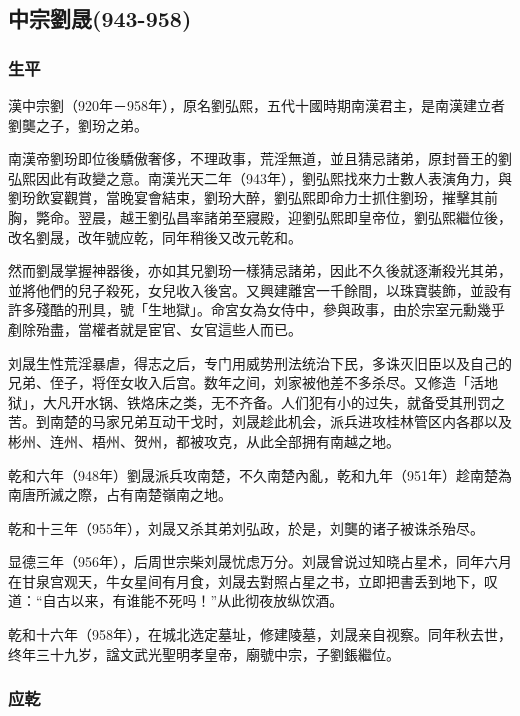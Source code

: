 
\subsection{中宗劉晟\tiny(943-958)}

\subsubsection{生平}

漢中宗劉（920年－958年），原名劉弘熙，五代十國時期南漢君主，是南漢建立者劉龑之子，劉玢之弟。

南漢帝劉玢即位後驕傲奢侈，不理政事，荒淫無道，並且猜忌諸弟，原封晉王的劉弘熙因此有政變之意。南漢光天二年（943年），劉弘熙找來力士數人表演角力，與劉玢飲宴觀賞，當晚宴會結束，劉玢大醉，劉弘熙即命力士抓住劉玢，摧擊其前胸，斃命。翌晨，越王劉弘昌率諸弟至寢殿，迎劉弘熙即皇帝位，劉弘熙繼位後，改名劉晟，改年號应乾，同年稍後又改元乾和。

然而劉晟掌握神器後，亦如其兄劉玢一樣猜忌諸弟，因此不久後就逐漸殺光其弟，並將他們的兒子殺死，女兒收入後宮。又興建離宮一千餘間，以珠寶裝飾，並設有許多殘酷的刑具，號「生地獄」。命宮女為女侍中，參與政事，由於宗室元勳幾乎剷除殆盡，當權者就是宦官、女官這些人而已。

刘晟生性荒淫暴虐，得志之后，专门用威势刑法统治下民，多诛灭旧臣以及自己的兄弟、侄子，将侄女收入后宫。数年之间，刘家被他差不多杀尽。又修造「活地狱」，大凡开水锅、铁烙床之类，无不齐备。人们犯有小的过失，就备受其刑罚之苦。到南楚的马家兄弟互动干戈时，刘晟趁此机会，派兵进攻桂林管区内各郡以及彬州、连州、梧州、贺州，都被攻克，从此全部拥有南越之地。

乾和六年（948年）劉晟派兵攻南楚，不久南楚內亂，乾和九年（951年）趁南楚為南唐所滅之際，占有南楚嶺南之地。

乾和十三年（955年），刘晟又杀其弟刘弘政，於是，刘龑的诸子被诛杀殆尽。

显德三年（956年），后周世宗柴刘晟忧虑万分。刘晟曾说过知晓占星术，同年六月在甘泉宫观天，牛女星间有月食，刘晟去對照占星之书，立即把書丢到地下，叹道：“自古以来，有谁能不死吗！”从此彻夜放纵饮酒。

乾和十六年（958年），在城北选定墓址，修建陵墓，刘晟亲自视察。同年秋去世，终年三十九岁，諡文武光聖明孝皇帝，廟號中宗，子劉鋹繼位。

\subsubsection{应乾}

